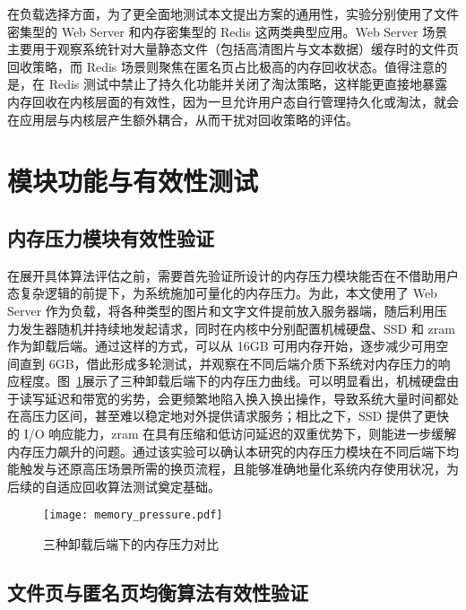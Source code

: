 在负载选择方面，为了更全面地测试本文提出方案的通用性，实验分别使用了文件密集型的 Web Server 和内存密集型的 Redis 这两类典型应用。Web Server 场景主要用于观察系统针对大量静态文件（包括高清图片与文本数据）缓存时的文件页回收策略，而 Redis 场景则聚焦在匿名页占比极高的内存回收状态。值得注意的是，在 Redis 测试中禁止了持久化功能并关闭了淘汰策略，这样能更直接地暴露内存回收在内核层面的有效性，因为一旦允许用户态自行管理持久化或淘汰，就会在应用层与内核层产生额外耦合，从而干扰对回收策略的评估。

\section{模块功能与有效性测试}

\subsection{内存压力模块有效性验证}

在展开具体算法评估之前，需要首先验证所设计的内存压力模块能否在不借助用户态复杂逻辑的前提下，为系统施加可量化的内存压力。为此，本文使用了 Web Server 作为负载，将各种类型的图片和文字文件提前放入服务器端，随后利用压力发生器随机并持续地发起请求，同时在内核中分别配置机械硬盘、SSD 和 zram 作为卸载后端。通过这样的方式，可以从 16GB 可用内存开始，逐步减少可用空间直到 6GB，借此形成多轮测试，并观察在不同后端介质下系统对内存压力的响应程度。图~\ref{fig:memory_pressure}展示了三种卸载后端下的内存压力曲线。可以明显看出，机械硬盘由于读写延迟和带宽的劣势，会更频繁地陷入换入换出操作，导致系统大量时间都处在高压力区间，甚至难以稳定地对外提供请求服务；相比之下，SSD 提供了更快的 I/O 响应能力，zram 在具有压缩和低访问延迟的双重优势下，则能进一步缓解内存压力飙升的问题。通过该实验可以确认本研究的内存压力模块在不同后端下均能触发与还原高压场景所需的换页流程，且能够准确地量化系统内存使用状况，为后续的自适应回收算法测试奠定基础。

\begin{figure}[h]
    \centering
    \texttt{[image: memory\_pressure.pdf]}
    \caption{三种卸载后端下的内存压力对比}
    \label{fig:memory_pressure}
\end{figure}

\subsection{文件页与匿名页均衡算法有效性验证}
\label{sec:file_page_anonymous_page_balance_algorithm_validation}

